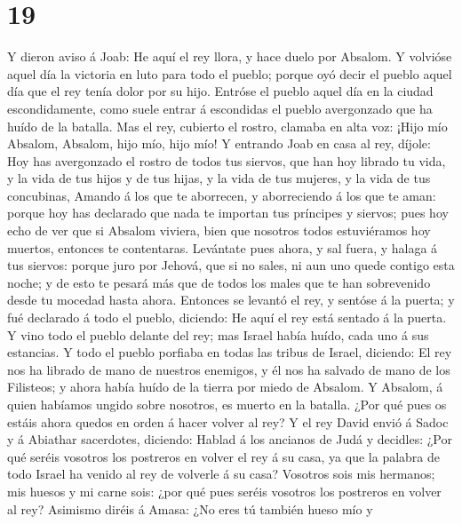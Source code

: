 \hypertarget{section-18}{%
\section{19}\label{section-18}}

 Y dieron aviso á Joab: He aquí el rey llora, y hace duelo
por Absalom.  Y volvióse aquel día la victoria en luto
para todo el pueblo; porque oyó decir el pueblo aquel día que el rey
tenía dolor por su hijo.  Entróse el pueblo aquel día en
la ciudad escondidamente, como suele entrar á escondidas el pueblo
avergonzado que ha huído de la batalla.  Mas el rey,
cubierto el rostro, clamaba en alta voz: ¡Hijo mío Absalom, Absalom,
hijo mío, hijo mío!  Y entrando Joab en casa al rey,
díjole: Hoy has avergonzado el rostro de todos tus siervos, que han hoy
librado tu vida, y la vida de tus hijos y de tus hijas, y la vida de tus
mujeres, y la vida de tus concubinas,  Amando á los que te
aborrecen, y aborreciendo á los que te aman: porque hoy has declarado
que nada te importan tus príncipes y siervos; pues hoy echo de ver que
si Absalom viviera, bien que nosotros todos estuviéramos hoy muertos,
entonces te contentaras.  Levántate pues ahora, y sal
fuera, y halaga á tus siervos: porque juro por Jehová, que si no sales,
ni aun uno quede contigo esta noche; y de esto te pesará más que de
todos los males que te han sobrevenido desde tu mocedad hasta ahora.
 Entonces se levantó el rey, y sentóse á la puerta; y fué
declarado á todo el pueblo, diciendo: He aquí el rey está sentado á la
puerta. Y vino todo el pueblo delante del rey; mas Israel había huído,
cada uno á sus estancias.  Y todo el pueblo porfiaba en
todas las tribus de Israel, diciendo: El rey nos ha librado de mano de
nuestros enemigos, y él nos ha salvado de mano de los Filisteos; y ahora
había huído de la tierra por miedo de Absalom.  Y
Absalom, á quien habíamos ungido sobre nosotros, es muerto en la
batalla. ¿Por qué pues os estáis ahora quedos en orden á hacer volver al
rey?  Y el rey David envió á Sadoc y á Abiathar
sacerdotes, diciendo: Hablad á los ancianos de Judá y decidles: ¿Por qué
seréis vosotros los postreros en volver el rey á su casa, ya que la
palabra de todo Israel ha venido al rey de volverle á su casa?
 Vosotros sois mis hermanos; mis huesos y mi carne sois:
¿por qué pues seréis vosotros los postreros en volver al rey?
 Asimismo diréis á Amasa: ¿No eres tú también hueso mío y
